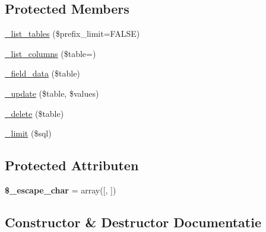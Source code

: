 \subsection*{Protected Members}
\begin{DoxyCompactItemize}
\item 
\mbox{\hyperlink{class_c_i___d_b__pdo__4d__driver_a435c0f3ce54fe7daa178baa8532ebd54}{\+\_\+list\+\_\+tables}} (\$prefix\+\_\+limit=F\+A\+L\+SE)
\item 
\mbox{\hyperlink{class_c_i___d_b__pdo__4d__driver_a7ccb7f9c301fe7f0a9db701254142b63}{\+\_\+list\+\_\+columns}} (\$table=\textquotesingle{}\textquotesingle{})
\item 
\mbox{\hyperlink{class_c_i___d_b__pdo__4d__driver_a95247d9671893adc3444cb184ad32ea1}{\+\_\+field\+\_\+data}} (\$table)
\item 
\mbox{\hyperlink{class_c_i___d_b__pdo__4d__driver_a2540b03a93fa73ae74c10d0e16fc073e}{\+\_\+update}} (\$table, \$values)
\item 
\mbox{\hyperlink{class_c_i___d_b__pdo__4d__driver_a133ea8446ded52589bd22cc9163d0896}{\+\_\+delete}} (\$table)
\item 
\mbox{\hyperlink{class_c_i___d_b__pdo__4d__driver_a3a02ea06541b8ecc25a33a61651562c8}{\+\_\+limit}} (\$sql)
\end{DoxyCompactItemize}
\subsection*{Protected Attributen}
\begin{DoxyCompactItemize}
\item 
\mbox{\label{class_c_i___d_b__pdo__4d__driver_aaec2fb0112850159063a8e47ad3aed6e}} 
{\bfseries \$\+\_\+escape\+\_\+char} = array(\textquotesingle{}\mbox{[}\textquotesingle{}, \textquotesingle{}\mbox{]}\textquotesingle{})
\end{DoxyCompactItemize}


\subsection{Constructor \& Destructor Documentatie}
\mbox{\label{class_c_i___d_b__pdo__4d__driver_a9162320adff1a1a4afd7f2372f753a3e}} 
